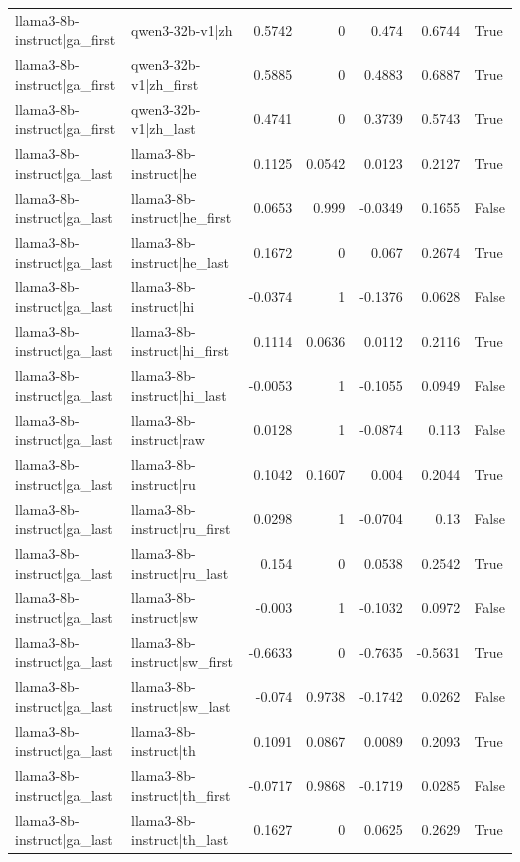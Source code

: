 \begin{table}
\begin{tabular}{l l r r r r l}
llama3-8b-instruct|ga_first & qwen3-32b-v1|zh & 0.5742 & 0 & 0.474 & 0.6744 & True \\
llama3-8b-instruct|ga_first & qwen3-32b-v1|zh_first & 0.5885 & 0 & 0.4883 & 0.6887 & True \\
llama3-8b-instruct|ga_first & qwen3-32b-v1|zh_last & 0.4741 & 0 & 0.3739 & 0.5743 & True \\
llama3-8b-instruct|ga_last & llama3-8b-instruct|he & 0.1125 & 0.0542 & 0.0123 & 0.2127 & True \\
llama3-8b-instruct|ga_last & llama3-8b-instruct|he_first & 0.0653 & 0.999 & -0.0349 & 0.1655 & False \\
llama3-8b-instruct|ga_last & llama3-8b-instruct|he_last & 0.1672 & 0 & 0.067 & 0.2674 & True \\
llama3-8b-instruct|ga_last & llama3-8b-instruct|hi & -0.0374 & 1 & -0.1376 & 0.0628 & False \\
llama3-8b-instruct|ga_last & llama3-8b-instruct|hi_first & 0.1114 & 0.0636 & 0.0112 & 0.2116 & True \\
llama3-8b-instruct|ga_last & llama3-8b-instruct|hi_last & -0.0053 & 1 & -0.1055 & 0.0949 & False \\
llama3-8b-instruct|ga_last & llama3-8b-instruct|raw & 0.0128 & 1 & -0.0874 & 0.113 & False \\
llama3-8b-instruct|ga_last & llama3-8b-instruct|ru & 0.1042 & 0.1607 & 0.004 & 0.2044 & True \\
llama3-8b-instruct|ga_last & llama3-8b-instruct|ru_first & 0.0298 & 1 & -0.0704 & 0.13 & False \\
llama3-8b-instruct|ga_last & llama3-8b-instruct|ru_last & 0.154 & 0 & 0.0538 & 0.2542 & True \\
llama3-8b-instruct|ga_last & llama3-8b-instruct|sw & -0.003 & 1 & -0.1032 & 0.0972 & False \\
llama3-8b-instruct|ga_last & llama3-8b-instruct|sw_first & -0.6633 & 0 & -0.7635 & -0.5631 & True \\
llama3-8b-instruct|ga_last & llama3-8b-instruct|sw_last & -0.074 & 0.9738 & -0.1742 & 0.0262 & False \\
llama3-8b-instruct|ga_last & llama3-8b-instruct|th & 0.1091 & 0.0867 & 0.0089 & 0.2093 & True \\
llama3-8b-instruct|ga_last & llama3-8b-instruct|th_first & -0.0717 & 0.9868 & -0.1719 & 0.0285 & False \\
llama3-8b-instruct|ga_last & llama3-8b-instruct|th_last & 0.1627 & 0 & 0.0625 & 0.2629 & True \\

\end{tabular}
\end{table}
